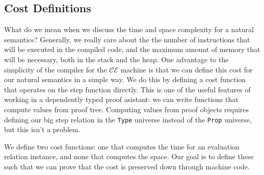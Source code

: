 \subsection{Cost Definitions}

What do we mean when we discuss the time and space complexity for a natural
semantics? Generally, we really care about the the number of instructions that
will be executed in the compiled code, and the maximum amount of memory that
will be necessary, both in the stack and the heap. One advantage to the
simplicity of the compiler for the $\mathcal{CE}$ machine is that we can define
this cost for our natural semantics in a simple way. We do this by defining a 
cost function that operates on the step function directly. This is one of the
useful features of working in a dependently typed proof asistant: we can write
functions that compute values from proof tree. Computing values from proof
objects requires defining our big step relation in the \texttt{Type} universe
instead of the \texttt{Prop} universe, but this isn't a problem.

We define two cost functions: one that computes the time for an evaluation
relation instance, and none that computes the space. Our goal is to define these
such that we can prove that the cost is preserved down through machine code. 

\begin{lstlisting}

\end{lstlisting}
